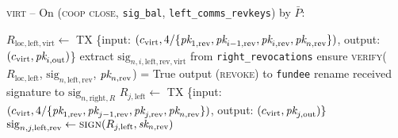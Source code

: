 \begin{center}
\begin{processbox}{\textsc{virt} -- On (\textsc{coop close},
  \texttt{sig\_bal}, \texttt{left\_comms\_revkeys}) by $\bar{P}$:}
\begin{algorithmic}[1]
        \State {}
        \State {}
        \State {}
        \label{code:virtual-layer:coop-close-intermediary:right-interm-verify-rev}
        \State {}
        \State {} 
        \State $R_{\mathrm{loc}, \mathrm{left}, \mathrm{virt}} \gets$ TX
        \{input: $(c_{\mathrm{virt}}, 4/\{\textit{pk}_{1, \mathrm{rev}}, \textit{pk}_{i-1,
        \mathrm{rev}}, \textit{pk}_{i, \mathrm{rev}}, \textit{pk}_{n, \mathrm{rev}}\})$, output:
        $(c_{\mathrm{virt}}, \textit{pk}_{i, \mathrm{out}})$\} 
        \State extract $\mathrm{sig}_{n, i, \mathrm{left}, \mathrm{rev},
        \mathrm{virt}}$ from \texttt{right\_revocations}
        \State ensure \textsc{verify}($R_{\mathrm{loc}, \mathrm{left}}$,
        $\mathrm{sig}_{n, \mathrm{left}, \mathrm{rev}}$, $\textit{pk}_{n, \mathrm{rev}}$) =
        True
        \label{code:virtual-layer:coop-close-intermediary:verify-left-virt-rev-end}
      \Else \: 
        \State output (\textsc{revoke}) to \texttt{fundee}
        \State {}
        \State {}
        \State {}
        \State rename received signature to $\mathrm{sig}_{n, \mathrm{right},
        R}$
          \State $R_{j, \mathrm{left}} \gets$ TX \{input: $(c_{\mathrm{virt}},
          4/\{\textit{pk}_{1, \mathrm{rev}}, \textit{pk}_{j-1, \mathrm{rev}}, \textit{pk}_{j,
          \mathrm{rev}}, \textit{pk}_{n, \mathrm{rev}}\})$, output: $(c_{\mathrm{virt}},
          \textit{pk}_{j, \mathrm{out}})\}$
          \State $\mathrm{sig}_{n, j, \mathrm{left}, \mathrm{rev}} \gets
          \textsc{sign}(R_{j, \mathrm{left}}, \textit{sk}_{n, \mathrm{rev}})$

\end{algorithmic}
\end{processbox}
\end{center}
